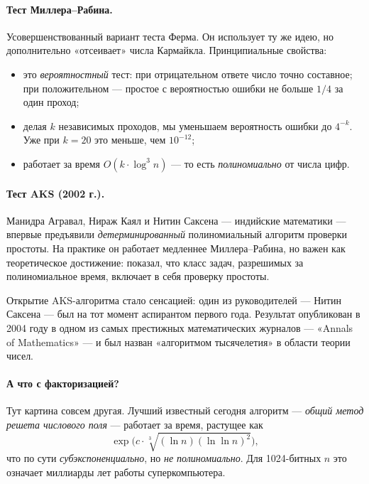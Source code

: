 \paragraph*{Тест Миллера--Рабина.} Усовершенствованный вариант теста Ферма. Он использует ту же идею, но дополнительно «отсеивает» числа Кармайкла. Принципиальные свойства:
\begin{itemize}
  \item это \emph{вероятностный} тест: при отрицательном ответе число точно составное; при положительном --- простое с вероятностью ошибки не больше $1/4$ за один проход;
  \item делая $k$ независимых проходов, мы уменьшаем вероятность ошибки до $4^{-k}$. Уже при $k = 20$ это меньше, чем $10^{-12}$;
  \item работает за время $O(k\cdot \log^3 n)$ --- то есть \emph{полиномиально} от числа цифр.
\end{itemize}

\paragraph*{Тест AKS (2002 г.).} Манидра Агравал, Нираж Каял и Нитин Саксена --- индийские математики --- впервые предъявили \emph{детерминированный} полиномиальный алгоритм проверки простоты. На практике он работает медленнее Миллера--Рабина, но важен как теоретическое достижение: показал, что класс задач, разрешимых за полиномиальное время, включает в себя проверку простоты.

\begin{interestbox}
Открытие AKS-алгоритма стало сенсацией: один из руководителей --- Нитин Саксена --- был на тот момент аспирантом первого года. Результат опубликован в 2004 году в одном из самых престижных математических журналов --- «Annals of Mathematics» --- и был назван «алгоритмом тысячелетия» в области теории чисел.
\end{interestbox}

\paragraph*{А что с факторизацией?} Тут картина совсем другая. Лучший известный сегодня алгоритм --- \emph{общий метод решета числового поля} --- работает за время, растущее как
\[
\exp\!\bigl(c\cdot \sqrt[3]{(\ln n)(\ln\ln n)^{2}}\bigr),
\]
что по сути \emph{субэкспоненциально}, но \emph{не полиномиально}. Для 1024-битных $n$ это означает миллиарды лет работы суперкомпьютера.

